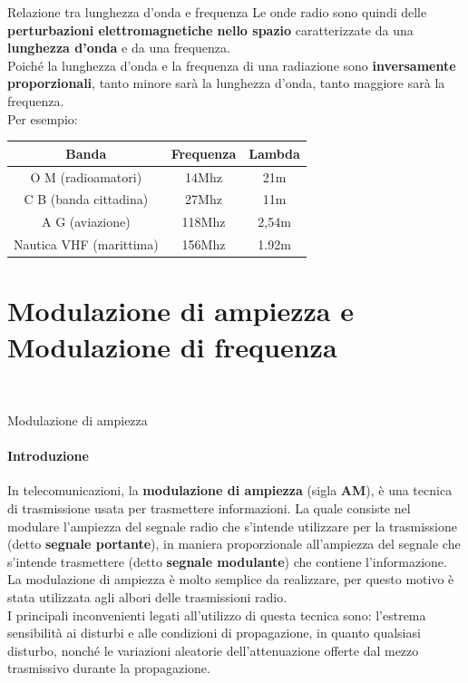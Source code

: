 \documentclass[aspectratio=169]{beamer}
\begin{document}
\begin{frame}{Relazione tra lunghezza d'onda e frequenza}
	Le onde radio sono quindi delle \textbf{perturbazioni elettromagnetiche nello spazio} caratterizzate da una \textbf{lunghezza d'onda} e da una frequenza.\\
	Poiché la lunghezza d'onda e la frequenza di una radiazione sono \textbf{inversamente proporzionali}, tanto minore sarà la lunghezza d'onda, tanto maggiore sarà la frequenza.\\
	\medskip
	Per esempio:\\
	\centering
	\begin{tabular}{|c|c|c|}
		\hline
		\textbf{Banda}& \textbf{Frequenza} & \textbf{Lambda} \\
		\hline
		O M (radioamatori)& 14Mhz & 21m \\
		\hline
		C B (banda cittadina)& 27Mhz & 11m\\
		\hline
		A G (aviazione)& 118Mhz & 2,54m \\
		\hline
		Nautica VHF (marittima)& 156Mhz & 1.92m \\
		\hline
	\end{tabular}
\end{frame}

\section{Modulazione di ampiezza e Modulazione di frequenza}
\begin{frame}
	\\
\end{frame}

\begin{frame}{Modulazione di ampiezza}
	\framesubtitle{Introduzione}
	In telecomunicazioni, la \textbf{modulazione di ampiezza} (sigla \textbf{AM}), è una tecnica di trasmissione usata per trasmettere informazioni. La quale consiste nel modulare l'ampiezza del segnale radio che s'intende utilizzare per la trasmissione (detto \textbf{segnale portante}), in maniera proporzionale all'ampiezza del segnale che s'intende trasmettere (detto \textbf{segnale modulante}) che contiene l'informazione.\\
	\medskip
	La modulazione di ampiezza è molto semplice da realizzare, per questo motivo è stata utilizzata agli albori delle trasmissioni radio.\\
	\medskip
	I principali inconvenienti legati all'utilizzo di questa tecnica sono: l'estrema sensibilità ai disturbi e alle condizioni di propagazione, in quanto qualsiasi disturbo, nonché le variazioni aleatorie dell'attenuazione offerte dal mezzo trasmissivo durante la propagazione.
\end{frame}
\end{document}
